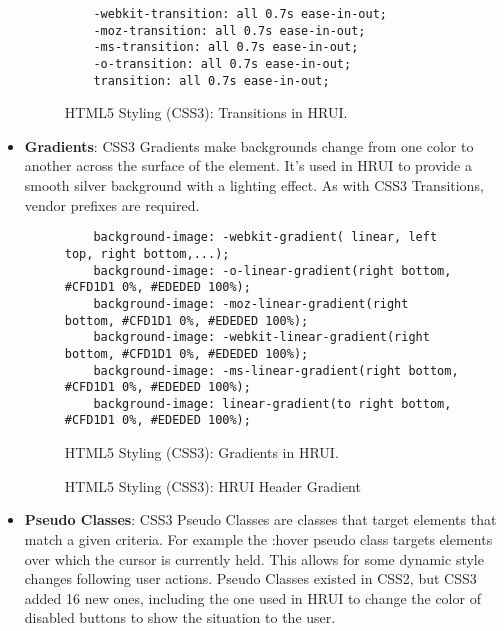 \begin{itemize}
  \begin{figure}[h]
    \centering
    \begin{verbatim}
    -webkit-transition: all 0.7s ease-in-out;
    -moz-transition: all 0.7s ease-in-out;
    -ms-transition: all 0.7s ease-in-out;
    -o-transition: all 0.7s ease-in-out;
    transition: all 0.7s ease-in-out;
    \end{verbatim}
    \caption{HTML5 Styling (CSS3): Transitions in HRUI.}
  \end{figure}
  \item \textbf{Gradients}: CSS3 Gradients make backgrounds change from one color to another across the surface of the element. It's used in HRUI to provide a smooth silver background with a lighting effect. As with CSS3 Transitions, vendor prefixes are required.
  \begin{figure}[h]
    \centering
    \begin{verbatim}
    background-image: -webkit-gradient( linear, left top, right bottom,...);
    background-image: -o-linear-gradient(right bottom, #CFD1D1 0%, #EDEDED 100%);
    background-image: -moz-linear-gradient(right bottom, #CFD1D1 0%, #EDEDED 100%);
    background-image: -webkit-linear-gradient(right bottom, #CFD1D1 0%, #EDEDED 100%);
    background-image: -ms-linear-gradient(right bottom, #CFD1D1 0%, #EDEDED 100%);
    background-image: linear-gradient(to right bottom, #CFD1D1 0%, #EDEDED 100%);
    \end{verbatim}
    \caption{HTML5 Styling (CSS3): Gradients in HRUI.}
  \end{figure}
  \begin{figure}[h]
    \begin{center}
    \end{center}
    \caption{HTML5 Styling (CSS3): HRUI Header Gradient}
  \end{figure}
  \item \textbf{Pseudo Classes}: CSS3 Pseudo Classes are classes that target elements that match a given criteria. For example the :hover pseudo class targets elements over which the cursor is currently held. This allows for some dynamic style changes following user actions. Pseudo Classes existed in CSS2, but CSS3 added 16 new ones, including the one used in HRUI to change the color of disabled buttons to show the situation to the user.

\end{itemize}
